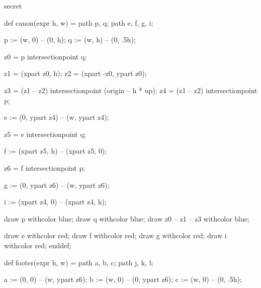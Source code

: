 



\startenvironment secret

	\setuppagenumbering[alternative=doublesided]

	\startMPdefinitions
	\stopMPdefinitions

	\startMPdefinitions
		def canon(expr h, w) =
			path p, q;
			path e, f, g, i;

			p := (w, 0) -- (0,   h);
			q := (w, h) -- (0, .5h);

			z0 = p intersectionpoint q; %

			z1 = (xpart  z0, h); %
			z2 = (xpart -z0, ypart z0); %

			z3 = (z1 -- z2) intersectionpoint (origin -- h * up); %
			z4 = (z1 -- z2) intersectionpoint p; %

			e := (0, ypart z4) -- (w, ypart z4);

			z5 = e intersectionpoint q; %

			f := (xpart z5, h) -- (xpart z5, 0);

			z6 = f intersectionpoint p; %

			g := (0, ypart z6) -- (w, ypart z6);

			i := (xpart z4, 0) -- (xpart z4, h);

			draw p withcolor blue;
			draw q withcolor blue;
			draw z0 -- z1 -- z3 withcolor blue;

			draw e withcolor red; %
			draw f withcolor red; %
			draw g withcolor red; %
			draw i withcolor red; %
		enddef;

		def footer(expr h, w) =
			path a, b, c;
			path j, k, l;

			a := (0, 0) -- (w, ypart z6);
			b := (w, 0) -- (0, ypart z6);
			c := (w, 0) -- (0, .5h);

